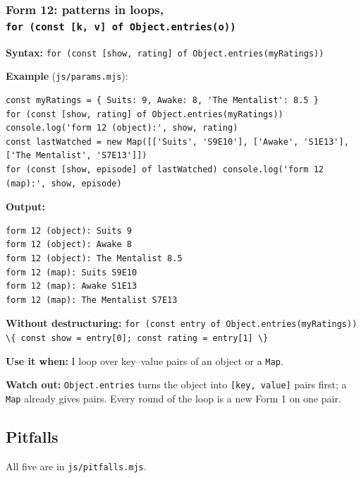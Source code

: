 \documentclass[
  10pt,
]{article}
\newcommand{\passthrough}[1]{#1}
\begin{document}
\hypertarget{form-12-patterns-in-loops-for-const-k-v-of-object.entrieso}{%
\subsubsection{\texorpdfstring{Form 12: patterns in loops,
\texttt{for\ (const\ {[}k,\ v{]}\ of\ Object.entries(o))}}{Form 12: patterns in loops, for (const {[}k, v{]} of Object.entries(o))}}\label{form-12-patterns-in-loops-for-const-k-v-of-object.entrieso}}

\textbf{Syntax:}
\passthrough{\lstinline!for (const [show, rating] of Object.entries(myRatings))!}

\textbf{Example} (\passthrough{\lstinline!js/params.mjs!}):

\begin{lstlisting}
const myRatings = { Suits: 9, Awake: 8, 'The Mentalist': 8.5 }
for (const [show, rating] of Object.entries(myRatings)) console.log('form 12 (object):', show, rating)
const lastWatched = new Map([['Suits', 'S9E10'], ['Awake', 'S1E13'], ['The Mentalist', 'S7E13']])
for (const [show, episode] of lastWatched) console.log('form 12 (map):', show, episode)
\end{lstlisting}

\textbf{Output:}

\begin{lstlisting}
form 12 (object): Suits 9
form 12 (object): Awake 8
form 12 (object): The Mentalist 8.5
form 12 (map): Suits S9E10
form 12 (map): Awake S1E13
form 12 (map): The Mentalist S7E13
\end{lstlisting}

\textbf{Without destructuring:}
\passthrough{\lstinline!for (const entry of Object.entries(myRatings)) \{ const show = entry[0]; const rating = entry[1] \}!}

\textbf{Use it when:} I loop over key--value pairs of an object or a
\passthrough{\lstinline!Map!}.

\textbf{Watch out:} \passthrough{\lstinline!Object.entries!} turns the
object into \passthrough{\lstinline![key, value]!} pairs first; a
\passthrough{\lstinline!Map!} already gives pairs. Every round of the
loop is a new Form 1 on one pair.

\hypertarget{pitfalls}{%
\subsection{Pitfalls}\label{pitfalls}}

All five are in \passthrough{\lstinline!js/pitfalls.mjs!}.
\end{document}
